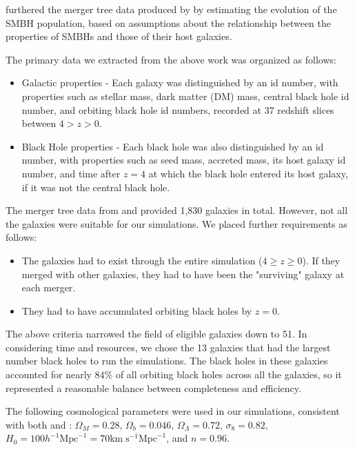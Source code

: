 \documentclass[fleqn,usenatbib,useAMS]{mnras}
\begin{document}
\citet{2015ApJ...799..178K} furthered the merger tree data produced by \citet{2012MNRAS.425..641L} by estimating the evolution of the SMBH population, based on assumptions about the relationship between the properties of SMBHs and those of their host galaxies.

The primary data we extracted from the above work was organized as follows:
\begin{itemize}
    \item Galactic properties - Each galaxy was distinguished by an id number, with properties such as stellar mass, dark matter (DM) mass, central black hole id number, and orbiting black hole id numbers, recorded at 37 redshift slices between $4 > z > 0$.
    \item Black Hole properties - Each black hole was also distinguished by an id number, with properties such as seed mass, accreted mass, its host galaxy id number, and time after $z=4$ at which the black hole entered its host galaxy, if it was not the central black hole.
\end{itemize}

The merger tree data from \citet{2012MNRAS.425..641L} and \citet{2015ApJ...799..178K} provided 1,830 galaxies in total.  However, not all the galaxies were suitable for our simulations.  We placed further requirements as follows:
\begin{itemize}
\item The galaxies had to exist through the entire simulation ($4\geq z \geq 0$).  If they merged with other galaxies, they had to have been the "surviving" galaxy at each merger.
\item They had to have accumulated orbiting black holes by $z = 0$.
\end{itemize}

The above criteria narrowed the field of eligible galaxies down to 51.  In considering time and resources, we chose the 13 galaxies that had the largest number black holes to run the simulations.  The black holes in these galaxies accounted for nearly $84{\%}$ of all orbiting black holes across all the galaxies, so it represented a reasonable balance between completeness and efficiency.

The following cosmological parameters were used in our simulations, consistent with both \citet{2012MNRAS.425..641L} and \citet{2015ApJ...799..178K}:   $\Omega_M = 0.28$, $\Omega_b = 0.046$, $\Omega_\Lambda = 0.72$, $\sigma_8 = 0.82$, $H_0 = 100h^{-1}\mathrm{Mpc}^{-1} = 70 \mathrm{km}\;\mathrm{s}^{-1} \mathrm{Mpc}^{-1}$, and $n = 0.96$.
\end{document}
